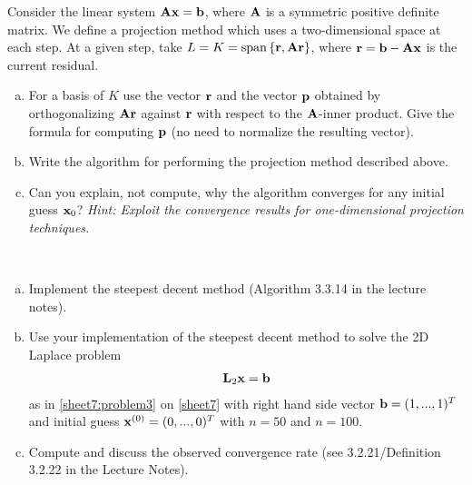 \begin{Sheet}
  \begin{Problem}
    Consider the linear system $\mathbf A\mathbf x = \mathbf b$, where $\mathbf A$ is a
    symmetric positive definite matrix. We define a projection method
    which uses a two-dimensional space at each step. At a given step,
    take $L = K = \operatorname{span}\left\{\mathbf r, \mathbf A\mathbf r\right\}$, where $\mathbf r = \mathbf b - \mathbf A\mathbf x$
    is the current residual.
    \begin{enumerate}[(a)]
    \item For a basis of $K$ use the vector $\mathbf r$ and the vector $\mathbf p$
      obtained by orthogonalizing $\mathbf A\mathbf r$ against $\mathbf r$ with
      respect to the $\mathbf A$-inner product. Give the formula for
      computing $\mathbf p$ (no need to normalize the resulting vector).
    \item Write the algorithm for performing the projection method
      described above.
    \item Can you explain, not compute, why the algorithm converges for any initial guess $\mathbf x_0$?
     \textit{Hint: Exploit the convergence
        results for one-dimensional projection techniques.}
    \end{enumerate}
  \end{Problem}

  \begin{Problem}[Programming]
    \label{sheet8:problem3}
    \hfill\\\vspace{-6ex}
    \begin{enumerate}[(a)]
    \item Implement the steepest decent method (Algorithm 3.3.14 in the
      lecture notes).
    \item Use your implementation of the steepest decent method to
      solve the 2D Laplace problem
      \begin{gather*}
        \mathbf L_2\mathbf x=\mathbf b
      \end{gather*}
      as in \cref{sheet7:problem3} on \cref{sheet7} with right hand
      side vector $\mathbf b=(1,...,1)^T$ and initial guess
      $\mathbf x^{(0)}=(0,...,0)^T$ with $n=50$ and $n=100$. 
    \item Compute and discuss the observed convergence rate (see 3.2.21/Definition 3.2.22 in the Lecture Notes).
    \end{enumerate}
  \end{Problem}



\end{Sheet}
